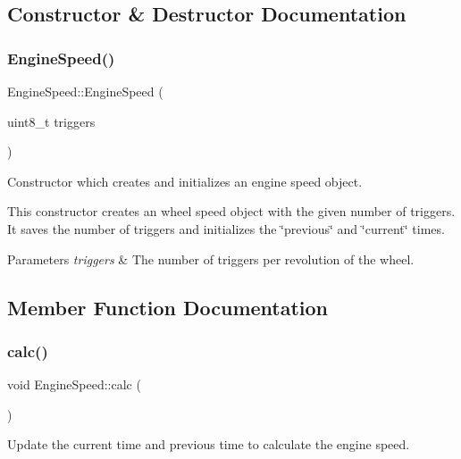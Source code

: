 \subsection{Constructor \& Destructor Documentation}
\mbox{\label{class_engine_speed_abbb3a8246d5db034f984fe367c9d58d4}} 
\subsubsection{\texorpdfstring{Engine\+Speed()}{EngineSpeed()}}
{\footnotesize\ttfamily Engine\+Speed\+::\+Engine\+Speed (\begin{DoxyParamCaption}\item[{uint8\+\_\+t}]{triggers }\end{DoxyParamCaption})}



Constructor which creates and initializes an engine speed object. 

This constructor creates an wheel speed object with the given number of triggers. It saves the number of triggers and initializes the \char`\"{}previous\char`\"{} and \char`\"{}current\char`\"{} times. 
\begin{DoxyParams}{Parameters}
{\em triggers} & The number of triggers per revolution of the wheel. \\
\hline
\end{DoxyParams}


\subsection{Member Function Documentation}
\mbox{\label{class_engine_speed_a760d5c7e84e92e0fe42d56d2e7cf2a42}} 
\subsubsection{\texorpdfstring{calc()}{calc()}}
{\footnotesize\ttfamily void Engine\+Speed\+::calc (\begin{DoxyParamCaption}{ }\end{DoxyParamCaption})}



Update the current time and previous time to calculate the engine speed. 

